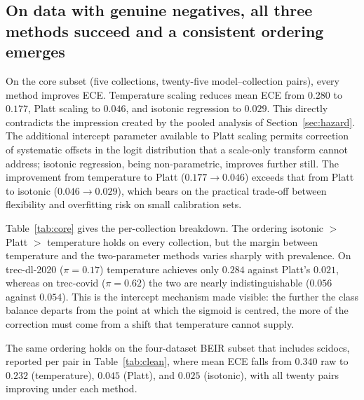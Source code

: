\documentclass[sn-mathphys-num,pdflatex]{sn-jnl}
\begin{document}
\subsection{On data with genuine negatives, all three methods succeed and a
consistent ordering emerges}\label{sec:clean}
On the core subset (five collections, twenty-five model--collection pairs), every
method improves ECE. Temperature scaling reduces mean ECE from $0.280$ to $0.177$,
Platt scaling to $0.046$, and isotonic regression to $0.029$. This directly
contradicts the impression created by the pooled analysis of
Section~\ref{sec:hazard}. The additional intercept parameter available to Platt
scaling permits correction of systematic offsets in the logit distribution that a
scale-only transform cannot address; isotonic regression, being non-parametric,
improves further still. The improvement from temperature to Platt
($0.177 \to 0.046$) exceeds that from Platt to isotonic ($0.046 \to 0.029$), which
bears on the practical trade-off between flexibility and overfitting risk on small
calibration sets.

Table~\ref{tab:core} gives the per-collection breakdown. The ordering isotonic $>$
Platt $>$ temperature holds on every collection, but the margin between temperature
and the two-parameter methods varies sharply with prevalence. On trec-dl-2020
($\pi = 0.17$) temperature achieves only $0.284$ against Platt's $0.021$, whereas
on trec-covid ($\pi = 0.62$) the two are nearly indistinguishable ($0.056$ against
$0.054$). This is the intercept mechanism made visible: the further the class
balance departs from the point at which the sigmoid is centred, the more of the
correction must come from a shift that temperature cannot supply.

The same ordering holds on the four-dataset BEIR subset that includes scidocs,
reported per pair in Table~\ref{tab:clean}, where mean ECE falls from $0.340$ raw
to $0.232$ (temperature), $0.045$ (Platt), and $0.025$ (isotonic), with all twenty
pairs improving under each method.
\end{document}
